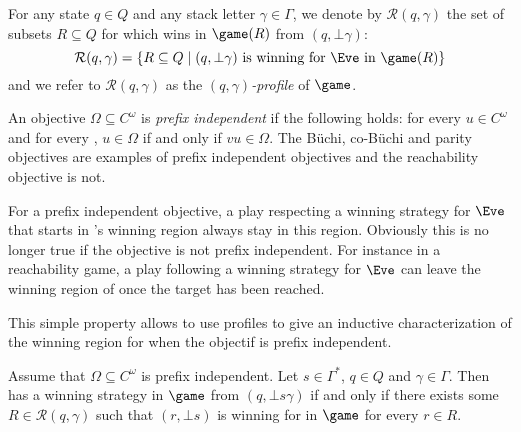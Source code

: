 
For any state $q\in Q$ and any stack letter $\gamma\in\Gamma$, we denote by $\mathcal{R}(q,\gamma)$ the set of subsets $R\subseteq Q$ for which \Eve wins in $\game(R)$ from $(q,\bot\gamma)$:
$$\mathcal{R}(q,\gamma)=\{
R\subseteq Q\mid (q,\bot\gamma) \text{ is winning for \Eve in } \game(R)
\}$$ and we refer to $\mathcal{R}(q,\gamma)$ as the \emph{$(q,\gamma)$-profile} of $\game$.

An objective $\Omega\subseteq C^\omega$ is \emph{prefix independent} if the following holds: for every $u\in C^\omega$ and for every ,  $u\in \Omega$ if and only if $vu\in \Omega$. The Büchi, co-Büchi and parity objectives are examples of prefix independent objectives and the reachability objective is not.


\begin{remark} 
\label{10-rem:stay-staying-alive}
For a prefix independent objective, a play respecting a winning strategy for $\Eve$ that starts in \Eve's winning region always stay in this region. Obviously this is no longer true if the objective is not prefix independent. For instance in a reachability game, a play following a winning strategy for $\Eve$ can leave the winning region of \Eve once the target has been reached. 	
\end{remark}


This simple property allows to use profiles to give an inductive characterization of the winning region for \Eve when the objectif is prefix independent.

\begin{proposition}\label{10-prop:returning} Assume that $\Omega\subseteq C^\omega$ is prefix independent. 
Let $s\in \Gamma^*$, $q\in Q$ and $\gamma\in\Gamma$. Then \Eve has a winning strategy in $\game$ from $(q,\bot s\gamma)$ if and only if there exists some $R\in\mathcal{R}(q,\gamma)$ such that $(r,\bot s)$ is winning for \Eve in $\game$ for every $r\in R$.
\end{proposition}

